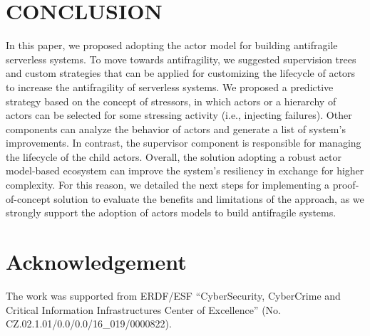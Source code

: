 \documentclass[conference]{IEEEtran}
\begin{document}
\section{\uppercase{Conclusion}}
\label{sec:conclusion}
In this paper, we proposed adopting the actor model for building antifragile serverless systems. To move towards antifragility, we suggested supervision trees and custom strategies that can be applied for customizing the lifecycle of actors to increase the antifragility of serverless systems. We proposed a predictive strategy based on the concept of stressors, in which actors or a hierarchy of actors can be selected for some stressing activity (i.e., injecting failures). Other components can analyze the behavior of actors and generate a list of system's improvements. In contrast, the supervisor component is responsible for managing the lifecycle of the child actors. Overall, the solution adopting a robust actor model-based ecosystem can improve the system's resiliency in exchange for higher complexity. For this reason, we detailed the next steps for implementing a proof-of-concept solution to evaluate the benefits and limitations of the approach, as we strongly support the adoption of actors models to build antifragile systems.


\section*{Acknowledgement}
The work was supported from ERDF/ESF “CyberSecurity, CyberCrime and Critical Information Infrastructures Center of Excellence” (No. CZ.02.1.01/0.0/0.0/16\_019/0000822).



{\small
%

}
\balance
\end{document}
